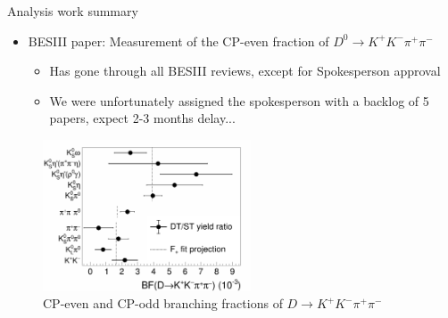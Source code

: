 \documentclass{beamer}
\begin{document}
\begin{frame}{Analysis work summary}
  \begin{itemize}
    \item{BESIII paper: Measurement of the CP-even fraction of $D^0\to K^+K^-\pi^+\pi^-$}
    \begin{itemize}
      \item{Has gone through all BESIII reviews, except for Spokesperson approval}
      \item{We were unfortunately assigned the spokesperson with a backlog of 5 papers, expect 2-3 months delay...}
    \end{itemize}
  \end{itemize}
  \begin{figure}
    \includegraphics[width = 0.55\textwidth, page = 1]{Plots/CPeven_fraction_combination_CPtags.png}
    \caption{CP-even and CP-odd branching fractions of $D\to K^+K^-\pi^+\pi^-$}
  \end{figure}
\end{frame}
\end{document}
